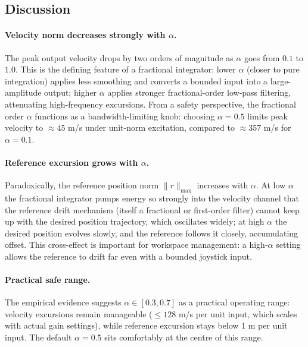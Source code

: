 \documentclass[11pt,a4paper]{article}
\theoremstyle{definition}
\begin{document}
\subsection{Discussion}

\paragraph{Velocity norm decreases strongly with $\alpha$.}
The peak output velocity drops by two orders of magnitude as $\alpha$ goes
from $0.1$ to $1.0$.  This is the defining feature of a fractional integrator:
lower $\alpha$ (closer to pure integration) applies less smoothing and converts
a bounded input into a large-amplitude output; higher $\alpha$ applies stronger
fractional-order low-pass filtering, attenuating high-frequency excursions.
From a safety perspective, the fractional order $\alpha$ functions as a
bandwidth-limiting knob: choosing $\alpha = 0.5$ limits peak velocity to
$\approx 45$ m/s under unit-norm excitation, compared to $\approx 357$ m/s
for $\alpha = 0.1$.

\paragraph{Reference excursion grows with $\alpha$.}
Paradoxically, the reference position norm $\|r\|_{\max}$ increases with
$\alpha$.  At low $\alpha$ the fractional integrator pumps energy so strongly
into the velocity channel that the reference drift mechanism (itself a
fractional or first-order filter) cannot keep up with the desired position
trajectory, which oscillates widely; at high $\alpha$ the desired position
evolves slowly, and the reference follows it closely, accumulating offset.
This cross-effect is important for workspace management: a high-$\alpha$
setting allows the reference to drift far even with a bounded joystick input.

\paragraph{Practical safe range.}
The empirical evidence suggests $\alpha \in [0.3, 0.7]$ as a practical
operating range: velocity excursions remain manageable ($\leq 128$ m/s per
unit input, which scales with actual gain settings), while reference excursion
stays below 1 m per unit input.  The default $\alpha = 0.5$ sits comfortably
at the centre of this range.

\end{document}
